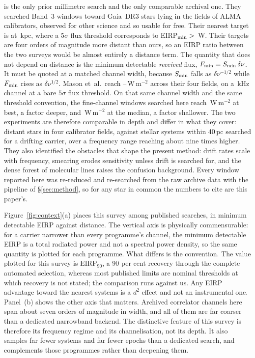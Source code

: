 \citet{Mason2025} is the only prior millimetre search and the only
comparable archival one. They searched Band~3 windows toward
\MasonNStar{} Gaia~DR3 stars lying in the fields of \MasonNCal{} ALMA
calibrators, observed for other science and so usable for free. Their
nearest target is at \MasonNearKpc\,kpc, where a $5\sigma$ flux threshold
corresponds to EIRP$_{\rm min}>{}$\MasonNearEirp\,W. Their targets are
four orders of magnitude more distant than ours, so an EIRP ratio between
the two surveys would be almost entirely a distance term. The quantity
that does not depend on distance is the minimum detectable \emph{received}
flux, $F_{\rm min}=S_{\rm min}\,\delta\nu$. It must be quoted at a matched
channel width, because $S_{\rm min}$ falls as $\delta\nu^{-1/2}$ while
$F_{\rm min}$ rises as $\delta\nu^{1/2}$. Mason
et~al.\ reach \MasonFluxLo--\MasonFluxHi\,W\,m$^{-2}$ across their four
fields, on a \MasonChanKHz\,kHz channel at a bare $5\sigma$ flux
threshold. On
that same channel width and the same threshold convention, the
fine-channel windows searched here reach \FluxMatchBest\,W\,m$^{-2}$ at
best, a factor \FluxBestRatio{} deeper, and \FluxMatchMed\,W\,m$^{-2}$ at
the median, a factor \FluxMedRatio{} shallower. The two experiments are
therefore comparable in depth and differ in what they cover: distant stars
in four calibrator fields, against \NSysClassA{} stellar systems within
40\,pc searched for a drifting carrier, over a frequency range reaching
about nine times higher. They also
identified the obstacles that shape the present method: drift rates scale
with frequency, smearing erodes sensitivity unless drift is searched for,
and the dense forest of molecular lines raises the confusion background.
Every window reported here was re-reduced and re-searched from the raw
archive data with the pipeline of \S\ref{sec:method}, so for any star in
common the numbers to cite are this paper's.

Figure~\ref{fig:context}(a) places this survey among published searches,
in minimum detectable EIRP against distance. The vertical axis is
physically commensurable: for a carrier narrower than every programme's
channel, the minimum detectable EIRP is a total radiated power and not a
spectral power density, so the same quantity is plotted for each
programme. What differs is the convention. The value plotted for this
survey is $\mathrm{EIRP}_{90}$, a 90 per cent recovery through the
complete automated selection, whereas most published limits are nominal
thresholds at which recovery is not stated; the comparison runs against
us. Any EIRP advantage toward the nearest systems is a $d^{2}$ effect and
not an instrumental one. Panel~(b) shows the other axis that matters.
Archived correlator channels here span about seven orders of magnitude in
width, and all of them are far coarser than a dedicated narrowband
backend. The distinctive feature of this survey is therefore its
frequency regime and its channelisation, not its depth. It also samples far
fewer systems and far fewer
epochs than a dedicated search, and complements those programmes rather
than deepening them.

